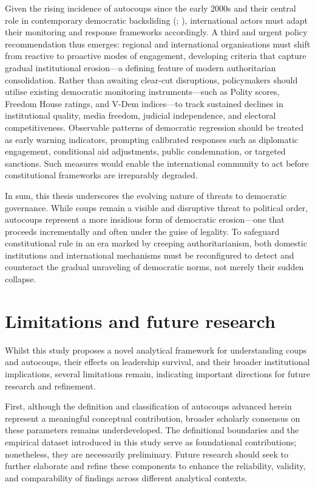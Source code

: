 \documentclass[
  12pt,
]{report}
\begin{document}
Given the rising incidence of autocoups since the early 2000s and their
central role in contemporary democratic backsliding
(;
),
international actors must adapt their monitoring and response frameworks
accordingly. A third and urgent policy recommendation thus emerges:
regional and international organisations must shift from reactive to
proactive modes of engagement, developing criteria that capture gradual
institutional erosion---a defining feature of modern authoritarian
consolidation. Rather than awaiting clear-cut disruptions, policymakers
should utilise existing democratic monitoring instruments---such as
Polity scores, Freedom House ratings, and V-Dem indices---to track
sustained declines in institutional quality, media freedom, judicial
independence, and electoral competitiveness. Observable patterns of
democratic regression should be treated as early warning indicators,
prompting calibrated responses such as diplomatic engagement,
conditional aid adjustments, public condemnation, or targeted sanctions.
Such measures would enable the international community to act before
constitutional frameworks are irreparably degraded.

In sum, this thesis underscores the evolving nature of threats to
democratic governance. While coups remain a visible and disruptive
threat to political order, autocoups represent a more insidious form of
democratic erosion---one that proceeds incrementally and often under the
guise of legality. To safeguard constitutional rule in an era marked by
creeping authoritarianism, both domestic institutions and international
mechanisms must be reconfigured to detect and counteract the gradual
unraveling of democratic norms, not merely their sudden collapse.

\section{Limitations and future
research}\label{limitations-and-future-research}

Whilst this study proposes a novel analytical framework for
understanding coups and autocoups, their effects on leadership survival,
and their broader institutional implications, several limitations
remain, indicating important directions for future research and
refinement.

First, although the definition and classification of autocoups advanced
herein represent a meaningful conceptual contribution, broader scholarly
consensus on these parameters remains underdeveloped. The definitional
boundaries and the empirical dataset introduced in this study serve as
foundational contributions; nonetheless, they are necessarily
preliminary. Future research should seek to further elaborate and refine
these components to enhance the reliability, validity, and comparability
of findings across different analytical contexts.
\end{document}
